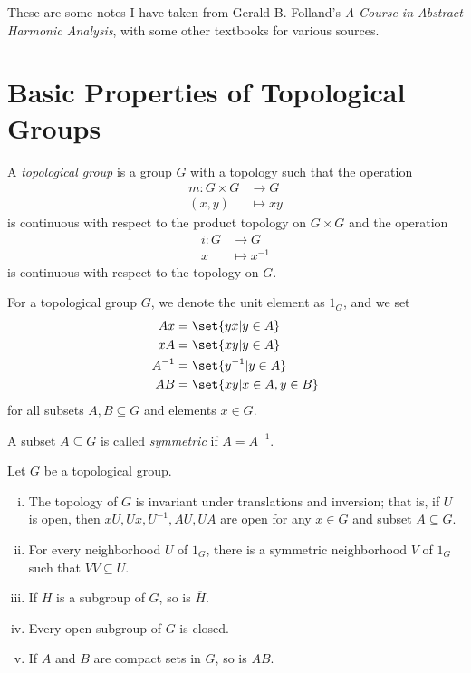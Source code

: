 \documentclass[10pt]{mypackage}
\begin{document}
\RaggedRight
These are some notes I have taken from Gerald B. Folland's \textit{A Course in Abstract Harmonic Analysis}, with some other textbooks for various sources.
\section{Basic Properties of Topological Groups}%
\begin{definition}
  A \textit{topological group} is a group $G$ with a topology such that the operation
  \begin{align*}
    m\colon G\times G &\rightarrow G\\
    \left( x,y \right)&\mapsto xy
  \end{align*}
  is continuous with respect to the product topology on $G\times G$ and the operation
  \begin{align*}
    i\colon G&\rightarrow G\\
    x &\mapsto x^{-1}
  \end{align*}
  is continuous with respect to the topology on $G$.\newline

  For a topological group $G$, we denote the unit element as $1_G$, and we set
  \begin{align*}
    Ax &= \set{yx | y\in A}\\
    xA &= \set{xy | y\in A}\\
    A^{-1} &= \set{y^{-1} | y\in A}\\
    AB &= \set{xy | x\in A,y\in B}
  \end{align*}
  for all subsets $A,B\subseteq G$ and elements $x\in G$.
\end{definition}
\begin{definition}
  A subset $A\subseteq G$ is called \textit{symmetric} if $A = A^{-1}$.
\end{definition}
\begin{proposition}
  Let $G$ be a topological group.
  \begin{enumerate}[(i)]
    \item The topology of $G$ is invariant under translations and inversion; that is, if $U$ is open, then $xU,Ux,U^{-1},AU,UA$ are open for any $x\in G$ and subset $A\subseteq G$.
    \item For every neighborhood $U$ of $1_G$, there is a symmetric neighborhood $V$ of $1_G$ such that $VV \subseteq U$.
    \item If $H$ is a subgroup of $G$, so is $ \overline{H} $.
    \item Every open subgroup of $G$ is closed.
    \item If $A$ and $B$ are compact sets in $G$, so is $AB$.
  \end{enumerate}
\end{proposition}
\end{document}
